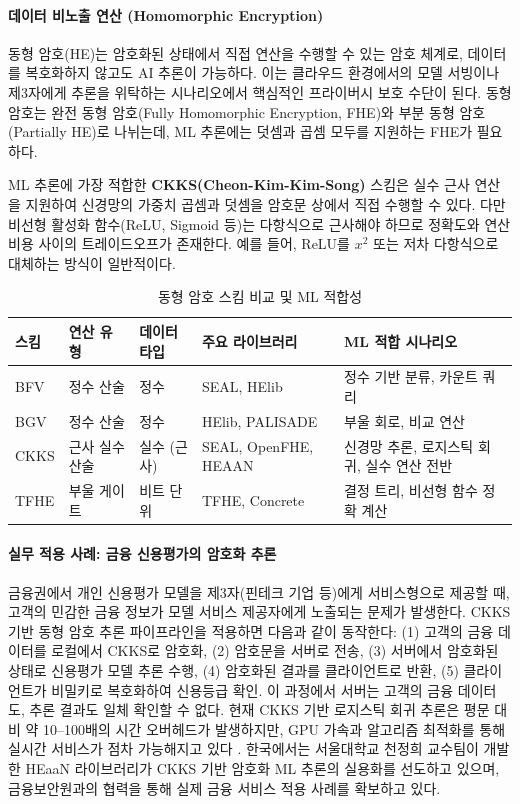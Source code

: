 \paragraph{데이터 비노출 연산 (Homomorphic Encryption)}

동형 암호(HE)는 암호화된 상태에서 직접 연산을 수행할 수 있는 암호 체계로, 데이터를 복호화하지 않고도 AI 추론이 가능하다. 이는 클라우드 환경에서의 모델 서빙이나 제3자에게 추론을 위탁하는 시나리오에서 핵심적인 프라이버시 보호 수단이 된다. 동형 암호는 완전 동형 암호(Fully Homomorphic Encryption, FHE)와 부분 동형 암호(Partially HE)로 나뉘는데, ML 추론에는 덧셈과 곱셈 모두를 지원하는 FHE가 필요하다.

ML 추론에 가장 적합한 \textbf{CKKS(Cheon-Kim-Kim-Song)} 스킴은 실수 근사 연산을 지원하여 신경망의 가중치 곱셈과 덧셈을 암호문 상에서 직접 수행할 수 있다. 다만 비선형 활성화 함수(ReLU, Sigmoid 등)는 다항식으로 근사해야 하므로 정확도와 연산 비용 사이의 트레이드오프가 존재한다. 예를 들어, ReLU를 $x^2$ 또는 저차 다항식으로 대체하는 방식이 일반적이다.

\begin{table}[htbp]
\centering
\caption{동형 암호 스킴 비교 및 ML 적합성}
\label{tab:he_schemes}
\begin{tabularx}{\textwidth}{p{1.8cm}p{2.5cm}p{2.5cm}p{2.5cm}X}
\toprule
\textbf{스킴} & \textbf{연산 유형} & \textbf{데이터 타입} & \textbf{주요 라이브러리} & \textbf{ML 적합 시나리오} \\
\midrule
BFV & 정수 산술 & 정수 & SEAL, HElib & 정수 기반 분류, 카운트 쿼리 \\
BGV & 정수 산술 & 정수 & HElib, PALISADE & 부울 회로, 비교 연산 \\
CKKS & 근사 실수 산술 & 실수 (근사) & SEAL, OpenFHE, HEAAN & 신경망 추론, 로지스틱 회귀, 실수 연산 전반 \\
TFHE & 부울 게이트 & 비트 단위 & TFHE, Concrete & 결정 트리, 비선형 함수 정확 계산 \\
\bottomrule
\end{tabularx}
\end{table}

\paragraph{실무 적용 사례: 금융 신용평가의 암호화 추론}

금융권에서 개인 신용평가 모델을 제3자(핀테크 기업 등)에게 서비스형으로 제공할 때, 고객의 민감한 금융 정보가 모델 서비스 제공자에게 노출되는 문제가 발생한다. CKKS 기반 동형 암호 추론 파이프라인을 적용하면 다음과 같이 동작한다: (1) 고객의 금융 데이터를 로컬에서 CKKS로 암호화, (2) 암호문을 서버로 전송, (3) 서버에서 암호화된 상태로 신용평가 모델 추론 수행, (4) 암호화된 결과를 클라이언트로 반환, (5) 클라이언트가 비밀키로 복호화하여 신용등급 확인. 이 과정에서 서버는 고객의 금융 데이터도, 추론 결과도 일체 확인할 수 없다. 현재 CKKS 기반 로지스틱 회귀 추론은 평문 대비 약 10--100배의 시간 오버헤드가 발생하지만, GPU 가속과 알고리즘 최적화를 통해 실시간 서비스가 점차 가능해지고 있다 \cite{oecd2024regulatory_ai_finance}. 한국에서는 서울대학교 천정희 교수팀이 개발한 HEaaN 라이브러리가 CKKS 기반 암호화 ML 추론의 실용화를 선도하고 있으며, 금융보안원과의 협력을 통해 실제 금융 서비스 적용 사례를 확보하고 있다.

